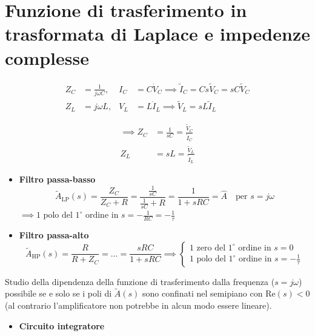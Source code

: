 \documentclass[11pt,a4paper]{report}
\begin{document}
\vspace{0.5cm}
\noindent\hrulefill
\vspace{0.5cm}

\section*{Funzione di trasferimento in trasformata di Laplace e impedenze complesse}
\begin{align*}
    Z_C &= \frac{1}{j\omega C}, & I_C &= C \dot{V}_C \implies \tilde{I}_C = C s \tilde{V}_C = sC \tilde{V}_C \\[0.5em]
    Z_L &= j\omega L, & V_L &= L \dot{I}_L \implies \tilde{V}_L = sL \tilde{I}_L
\end{align*}



\begin{align*}
    \implies Z_C &= \frac{1}{sC} = \frac{\tilde{V}_C}{\tilde{I}_C} \\[0.5em]
    Z_L &= sL = \frac{\tilde{V}_L}{\tilde{I}_L}
\end{align*}

\begin{itemize}
    \item \textbf{Filtro passa-basso}
    \[
        \tilde{A}_{\text{LP}}(s) = \frac{Z_C}{Z_C + R} = \frac{\frac{1}{sC}}{\frac{1}{sC} + R} = \frac{1}{1 + sRC} = \hat{A} \quad \text{per } s=j\omega
    \]
    $\implies 1 \text{ polo del } 1^\circ \text{ ordine in } s = -\frac{1}{RC} = -\frac{1}{\tau}$
    
    \item \textbf{Filtro passa-alto}
    \[
        \tilde{A}_{\text{HP}}(s) = \frac{R}{R + Z_C} = \dots = \frac{sRC}{1 + sRC} \implies
        \begin{cases}
            1 \text{ zero del } 1^\circ \text{ ordine in } s=0 \\
            1 \text{ polo del } 1^\circ \text{ ordine in } s=-\frac{1}{\tau}
        \end{cases}
    \]
\end{itemize}

Studio della dipendenza della funzione di trasferimento dalla frequenza ($s=j\omega$) possibile se e solo se i poli di $\tilde{A}(s)$ sono confinati nel semipiano con $\text{Re}(s) < 0$ (al contrario l'amplificatore non potrebbe in alcun modo essere lineare).

\begin{itemize}
    \item \textbf{Circuito integratore}
\end{itemize}
\end{document}
